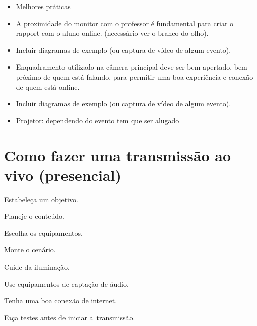 \documentclass[
]{book}
\providecommand{\tightlist}{%
  \setlength{\itemsep}{0pt}\setlength{\parskip}{0pt}}
\begin{document}
\begin{itemize}
\tightlist
\item
  Melhores práticas~
\end{itemize}

\begin{itemize}
\tightlist
\item
  A proximidade do monitor com o professor é fundamental para criar o
  rapport com o aluno online. (necessário ver o branco do olho).~
\end{itemize}

\begin{itemize}
\tightlist
\item
  Incluir diagramas de exemplo (ou captura de vídeo de algum evento).~
\end{itemize}

\begin{itemize}
\tightlist
\item
  Enquadramento utilizado na câmera principal deve ser bem apertado, bem
  próximo de quem está falando, para permitir uma boa experiência e
  conexão de quem está online.~
\end{itemize}

\begin{itemize}
\tightlist
\item
  Incluir diagramas de exemplo (ou captura de vídeo de algum evento).~
\end{itemize}

\begin{itemize}
\tightlist
\item
  Projetor: dependendo do evento tem que ser alugado~
\end{itemize}

\chapter{Como fazer uma transmissão ao vivo
(presencial)}\label{como-fazer-uma-transmissuxe3o-ao-vivo-presencial}

Estabeleça um objetivo.

Planeje o conteúdo.

Escolha os equipamentos.

Monte o cenário.

Cuide da iluminação.

Use equipamentos de captação de áudio.

Tenha uma boa conexão de internet.

Faça testes antes de iniciar a~transmissão.
\end{document}
